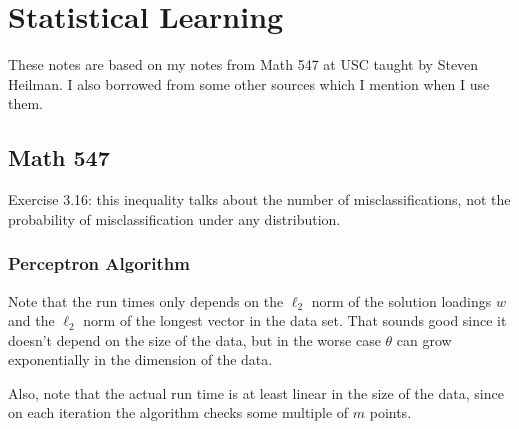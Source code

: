 %
%
%
%
%
%
%
%
%
%
%
%
%
%

\section{Statistical Learning}

These notes are based on my notes from Math 547 at USC taught by Steven Heilman. I also borrowed from some other sources which I mention when I use them.




\subsection{Math 547}

Exercise 3.16: this inequality talks about the number of misclassifications, not the probability of misclassification under any distribution.

\subsubsection{Perceptron Algorithm}

\begin{remark}

Note that the run times only depends on the \(\ell_2\) norm of the solution loadings \(w\) and the \(\ell_2\) norm of the longest vector in the data set. That sounds good since it doesn't depend on the size of the data, but in the worse case \(\theta\) can grow exponentially in the dimension of the data.

Also, note that the actual run time is at least linear in the size of the data, since on each iteration the algorithm checks some multiple of \(m\) points.

\end{remark}

